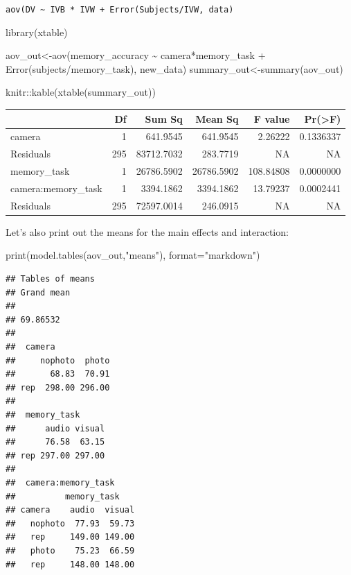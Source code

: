 \documentclass[
]{book}
\newenvironment{Shaded}{\begin{snugshade}}{\end{snugshade}}
\newcommand{\AttributeTok}[1]{\textcolor[rgb]{0.77,0.63,0.00}{#1}}
\newcommand{\FunctionTok}[1]{\textcolor[rgb]{0.00,0.00,0.00}{#1}}
\newcommand{\NormalTok}[1]{#1}
\newcommand{\OtherTok}[1]{\textcolor[rgb]{0.56,0.35,0.01}{#1}}
\newcommand{\SpecialCharTok}[1]{\textcolor[rgb]{0.00,0.00,0.00}{#1}}
\newcommand{\StringTok}[1]{\textcolor[rgb]{0.31,0.60,0.02}{#1}}
\begin{document}
\texttt{aov(DV\ \textasciitilde{}\ IVB\ *\ IVW\ +\ Error(Subjects/IVW,\ data)}

\begin{Shaded}
\begin{Highlighting}[]
\FunctionTok{library}\NormalTok{(xtable)}

\NormalTok{aov\_out}\OtherTok{\textless{}{-}}\FunctionTok{aov}\NormalTok{(memory\_accuracy }\SpecialCharTok{\textasciitilde{}}\NormalTok{ camera}\SpecialCharTok{*}\NormalTok{memory\_task }\SpecialCharTok{+} \FunctionTok{Error}\NormalTok{(subjects}\SpecialCharTok{/}\NormalTok{memory\_task), new\_data)}
\NormalTok{summary\_out}\OtherTok{\textless{}{-}}\FunctionTok{summary}\NormalTok{(aov\_out)}

\NormalTok{knitr}\SpecialCharTok{::}\FunctionTok{kable}\NormalTok{(}\FunctionTok{xtable}\NormalTok{(summary\_out))}
\end{Highlighting}
\end{Shaded}

\begin{tabular}{l|r|r|r|r|r}
\hline
  & Df & Sum Sq & Mean Sq & F value & Pr(>F)\\
\hline
camera & 1 & 641.9545 & 641.9545 & 2.26222 & 0.1336337\\
\hline
Residuals & 295 & 83712.7032 & 283.7719 & NA & NA\\
\hline
memory\_task & 1 & 26786.5902 & 26786.5902 & 108.84808 & 0.0000000\\
\hline
camera:memory\_task & 1 & 3394.1862 & 3394.1862 & 13.79237 & 0.0002441\\
\hline
Residuals & 295 & 72597.0014 & 246.0915 & NA & NA\\
\hline
\end{tabular}

Let's also print out the means for the main effects and interaction:

\begin{Shaded}
\begin{Highlighting}[]
\FunctionTok{print}\NormalTok{(}\FunctionTok{model.tables}\NormalTok{(aov\_out,}\StringTok{"means"}\NormalTok{), }\AttributeTok{format=}\StringTok{"markdown"}\NormalTok{)}
\end{Highlighting}
\end{Shaded}

\begin{verbatim}
## Tables of means
## Grand mean
##          
## 69.86532 
## 
##  camera 
##     nophoto  photo
##       68.83  70.91
## rep  298.00 296.00
## 
##  memory_task 
##      audio visual
##      76.58  63.15
## rep 297.00 297.00
## 
##  camera:memory_task 
##          memory_task
## camera    audio  visual
##   nophoto  77.93  59.73
##   rep     149.00 149.00
##   photo    75.23  66.59
##   rep     148.00 148.00
\end{verbatim}
\end{document}
